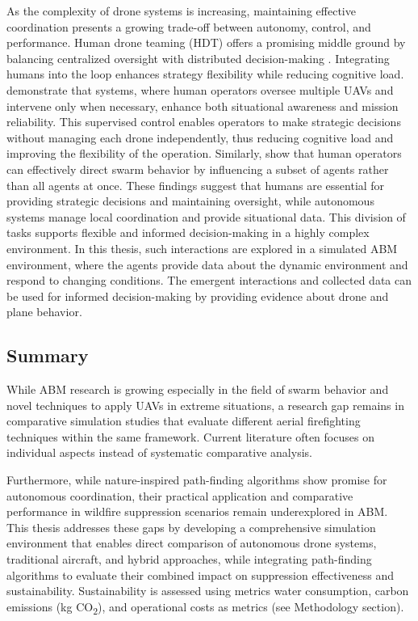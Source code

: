 \documentclass[11pt, a4paper]{article}
\begin{document}
As the complexity of drone systems is increasing, maintaining effective coordination presents a growing trade-off between autonomy, control, and performance. Human drone teaming (HDT) offers a promising middle ground by balancing centralized oversight with distributed decision-making \citep{asavasirikulkij2023human_Workload}. Integrating humans into the loop enhances strategy flexibility while reducing cognitive load. \citet{SAT_first} demonstrate that systems, where human operators oversee multiple UAVs and intervene only when necessary, enhance both situational awareness and mission reliability. This supervised control enables operators to make strategic decisions without managing each drone independently, thus reducing cognitive load and improving the flexibility of the operation. Similarly, \citet*{lewisHumanFactorsIssues2012} show that human operators can effectively direct swarm behavior by influencing a subset of agents rather than all agents at once.
These findings suggest that humans are essential for providing strategic decisions and maintaining oversight, while autonomous systems manage local coordination and provide situational data. This division of tasks supports flexible and informed decision-making in a highly complex environment.
In this thesis, such interactions are explored in a simulated ABM environment, where the agents provide data about the dynamic environment and respond to changing conditions. The emergent interactions and collected data can be used for informed decision-making by providing evidence about drone and plane behavior.

\subsection{Summary}

While ABM research is growing especially in the field of swarm behavior and novel techniques to apply UAVs in extreme situations, a research gap remains in comparative simulation studies that evaluate different aerial firefighting techniques within the same framework. Current literature often focuses on individual aspects instead of systematic comparative analysis.

Furthermore, while nature-inspired path-finding algorithms show promise for autonomous coordination, their practical application and comparative performance in wildfire suppression scenarios remain underexplored in ABM. This thesis addresses these gaps by developing a comprehensive simulation environment that enables direct comparison of autonomous drone systems, traditional aircraft, and hybrid approaches, while integrating path-finding algorithms to evaluate their combined impact on suppression effectiveness and sustainability. Sustainability is assessed using metrics water consumption, carbon emissions (kg CO\textsubscript{2}), and operational costs as metrics (see Methodology section).
\end{document}

